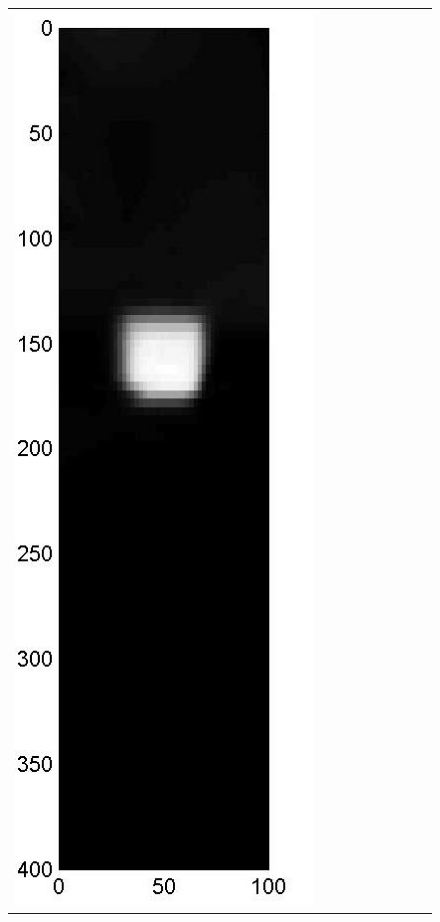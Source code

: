 \documentclass[11pt]{article}
\begin{document}
{\begin{figure}[!h]
\begin{center}
\begin{tabular}{|c|c|c|c|c|c|c|c|c|}
			\includegraphics[width=.9\iwidth]{figures/newFigs/noisy/resultsExp-3-mkTV}
			&

\end{tabular}
\end{center}
\end{figure}}
\end{document}

